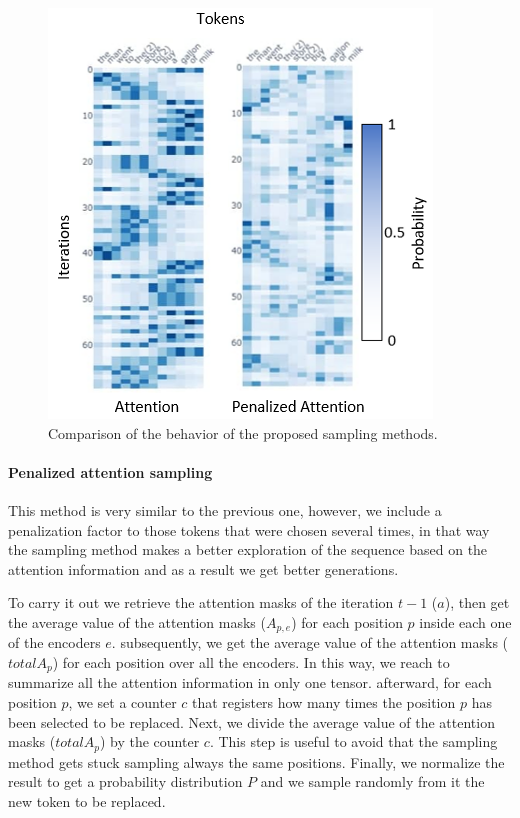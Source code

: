 \documentclass[10pt,twocolumn,letterpaper]{article}
\begin{document}
\begin{figure}
   \centering
   \includegraphics[scale=0.7]{attComp.PNG}
   \caption{Comparison of the behavior of the proposed sampling methods.}
   \label{fig:AttentComp}
\end{figure}

\paragraph{Penalized attention sampling}
This method is very similar to the previous one, however, we include a penalization factor
to those tokens that were chosen several times, in that way the sampling method makes a better
exploration of the sequence based on the attention information and as a result we get better
generations.

To carry it out we retrieve the attention masks of the iteration $t-1$ ($a$), then get the average value of
the attention masks ($A_{p,e}$) for each position $p$ inside each one of the encoders $e$. subsequently, we get
the average value of the attention masks ($totalA_{p}$) for each position over all the encoders.
In this way, we reach to summarize all the attention information in only one tensor.
afterward, for each position $p$, we set a counter $c$ that registers how many times the position $p$ has been selected to be replaced.
Next, we divide the average value of the attention masks ($totalA_{p}$) by the counter $c$.
This step is useful to avoid that the sampling method gets stuck sampling always the same positions.
Finally, we normalize the result to get a probability distribution $P$ and we sample randomly from it the new token to be replaced.
\end{document}
